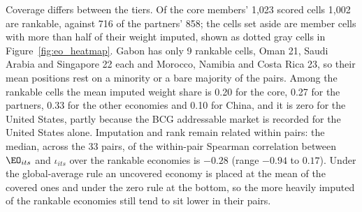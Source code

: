 Coverage differs between the tiers. Of the core members' 1{,}023 scored cells 1{,}002 are
rankable, against 716 of the partners' 858; the cells set aside are member cells with more than
half of their weight imputed, shown as dotted gray cells in Figure~\ref{fig:eo_heatmap}. Gabon has
only 9 rankable cells, Oman 21, Saudi Arabia and Singapore 22 each and Morocco, Namibia and Costa
Rica 23, so their mean positions rest on a minority or a bare majority of the pairs. Among the
rankable cells the mean imputed weight share is 0.20 for the core, 0.27 for the partners, 0.33 for
the other economies and 0.10 for China, and it is zero for the United States, partly because the
BCG addressable market is recorded for the United States alone. Imputation and rank remain related
within pairs: the median, across the 33 pairs, of the within-pair Spearman correlation between
$\EO_{its}$ and $\iota_{its}$ over the rankable economies is $-0.28$ (range $-0.94$ to $0.17$).
Under the global-average rule an uncovered economy is placed at the mean of the covered ones and
under the zero rule at the bottom, so the more heavily imputed of the rankable economies still tend
to sit lower in their pairs.

